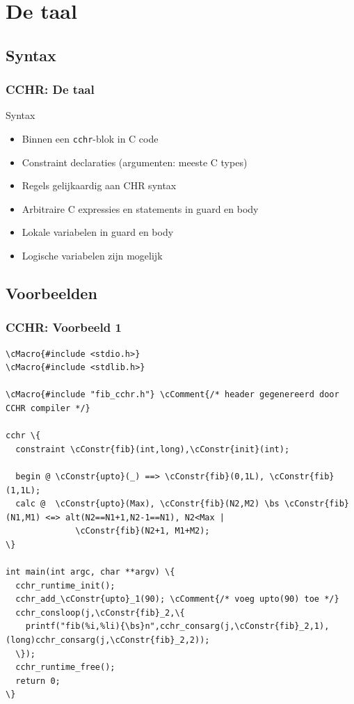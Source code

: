 \documentclass{beamer}
\newcommand{\bs}{$\backslash$}
\newcommand{\cConstr}[1]{\textcolor{blue}{#1}}
\newcommand{\cMacro}[1]{\textcolor{red}{#1}}
\newcommand{\cComment}[1]{\textcolor{dgreen}{#1}}
\newcommand{\code}[1]{{\tt #1}}
\begin{document}
\section{De taal}

\subsection{Syntax}

\begin{frame}
  \frametitle{CCHR: De taal}
  \begin{block}{Syntax}
    \begin{itemize}
      \item Binnen een \code{cchr}-blok in C code
      \item Constraint declaraties (argumenten: meeste C types)
      \item Regels gelijkaardig aan CHR syntax
      \item Arbitraire C expressies en statements in guard en body
      \item Lokale variabelen in guard en body
      \item Logische variabelen zijn mogelijk
    \end{itemize}
  \end{block}
\end{frame}

\subsection{Voorbeelden}

\begin{frame}[containsverbatim]
  \frametitle{CCHR: Voorbeeld 1}
  \begin{example}[Voorbeeld 1]{\tiny
\begin{Verbatim}[commandchars=\\\{\}]
\cMacro{#include <stdio.h>}
\cMacro{#include <stdlib.h>}

\cMacro{#include "fib_cchr.h"} \cComment{/* header gegenereerd door CCHR compiler */}

cchr \{
  constraint \cConstr{fib}(int,long),\cConstr{init}(int);

  begin @ \cConstr{upto}(_) ==> \cConstr{fib}(0,1L), \cConstr{fib}(1,1L);
  calc @  \cConstr{upto}(Max), \cConstr{fib}(N2,M2) \bs \cConstr{fib}(N1,M1) <=> alt(N2==N1+1,N2-1==N1), N2<Max |
              \cConstr{fib}(N2+1, M1+M2);
\}

int main(int argc, char **argv) \{
  cchr_runtime_init();
  cchr_add_\cConstr{upto}_1(90); \cComment{/* voeg upto(90) toe */}
  cchr_consloop(j,\cConstr{fib}_2,\{
    printf("fib(%i,%li){\bs}n",cchr_consarg(j,\cConstr{fib}_2,1),(long)cchr_consarg(j,\cConstr{fib}_2,2));
  \});
  cchr_runtime_free();
  return 0;
\}
\end{Verbatim}
}  \end{example}
\end{frame}
\end{document}
